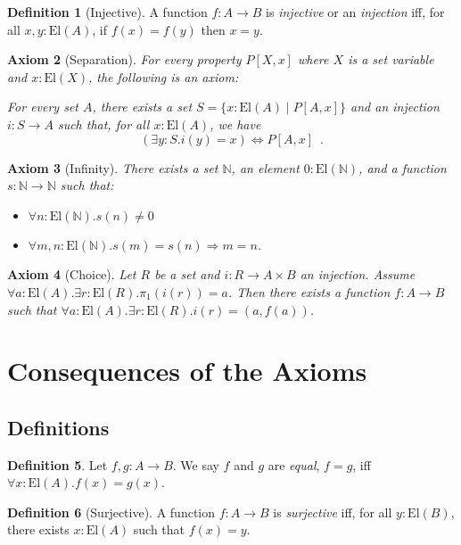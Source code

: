 \documentclass{book}
\newtheorem{ax}{Axiom}[chapter]
\theoremstyle{definition}
\newtheorem{df}[ax]{Definition}
\newcommand{\El}[1]{\ensuremath{\mathrm{El} \left( {#1} \right)}}
\begin{document}
\begin{df}[Injective]
A function $f : A \rightarrow B$ is \emph{injective} or an \emph{injection} iff, for all $x,y : \El{A}$, if $f(x) = f(y)$ then $x = y$.
\end{df}

\begin{ax}[Separation]
For every property $P[X,x]$ where $X$ is a set variable and $x : \El{X}$, the following is an axiom:

For every set $A$, there exists a set $S = \{ x : \El{A} \mid P[A,x] \}$ and an injection $i : S \rightarrow A$ such that, for all $x : \El{A}$, we have
\[ (\exists y : S. i(y) = x) \Leftrightarrow P[A,x] \enspace . \]
\end{ax}

\begin{ax}[Infinity]
There exists a set $\mathbb{N}$, an element $0 : \El{\mathbb{N}}$, and a function $s : \mathbb{N} \rightarrow \mathbb{N}$ such that:
\begin{itemize}
\item $\forall n : \El{\mathbb{N}}. s(n) \neq 0$
\item $\forall m,n : \El{\mathbb{N}}. s(m) = s(n) \Rightarrow m = n$.
\end{itemize}
\end{ax}

\begin{ax}[Choice]
Let $R$ be a set and $i : R \rightarrow A \times B$ an injection. Assume $\forall a : \El{A}. \exists r : \El{R}. \pi_1(i(r)) = a$. Then there exists a function $f : A \rightarrow B$ such that $\forall a : \El{A}. \exists r : \El{R}.i(r) = (a, f(a))$.
\end{ax}

\section{Consequences of the Axioms}

\subsection{Definitions} %

\begin{df}
Let $f,g : A \rightarrow B$. We say $f$ and $g$ are \emph{equal}, $f = g$, iff $\forall x : \El{A}. f(x) = g(x)$.
\end{df}

\begin{df}[Surjective]
A function $f : A \rightarrow B$ is \emph{surjective} iff, for all $y : \El{B}$, there exists $x : \El{A}$ such that $f(x) = y$.
\end{df}
\end{document}
